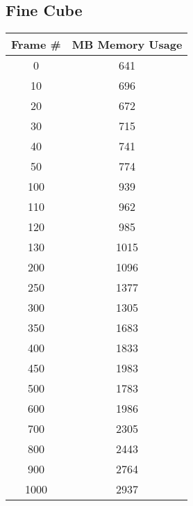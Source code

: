 \subsection{Fine Cube}
\begin{tabular}{| c | c |}
\hline
\textbf{Frame \#} & \textbf{MB Memory Usage}\\\hline
0 & 641\\
10 & 696\\
20 & 672\\
30 & 715\\
40 & 741\\
50 & 774\\
100 & 939\\
110 & 962\\
120 & 985\\
130 & 1015\\
200 & 1096\\
250 & 1377\\
300 & 1305\\
350 & 1683\\
400 & 1833\\
450 & 1983\\
500 & 1783\\
600 & 1986\\
700 & 2305\\
800 & 2443\\
900 & 2764\\
1000 & 2937\\\hline
\end{tabular}